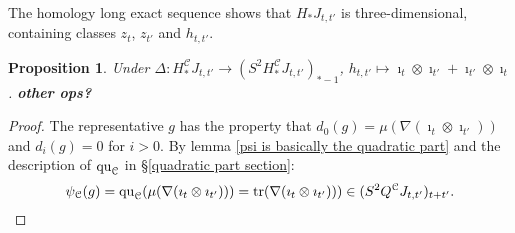 \documentclass[11pt]{amsart}
\theoremstyle{plain}
\newtheorem{prop}[thm]{Proposition}
\theoremstyle{definition}
\DeclareMathOperator{\trace}{tr}
\renewcommand{\to}{\longrightarrow}
\newcommand{\calc}{\mathcal{C}}
\theoremstyle{plain}
\newcommand{\quadratic}{\textup{qu}}
\newcommand{\Nabla}{\nabla}
\begin{document}
\begin{Operations on the Bousfield-Kan spectral sequence}
The homology long exact sequence shows that $H_*J_{t,t'}$ is three-dimensional, containing classes $ z_t$, $ z_{t'}$ and $h_{t,t'}$.
\begin{prop}\label{prop on three cell}
Under $\Delta:H_*^{\calc}J_{t,t'}\to (S^2H_*^{\calc}J_{t,t'})_{*-1}$, $h_{t,t'}\mapsto\imath_t\otimes\imath_{t'}+\imath_{t'}\otimes\imath_t$. \textbf{other ops?}
\end{prop}
\begin{proof}
The representative $g$ has the property that $d_0(g)=\mu(\Nabla(\imath_t\otimes\imath_{t'}))$ and $d_i(g)=0$ for $i>0$. By lemma \ref{psi is basically the quadratic part} and the description of $\quadratic_\calc$ in \S\ref{quadratic part section}:
\[\psi_\calc(g)=
\quadratic_\calc(\mu(\Nabla(\imath_t\otimes\imath_{t'})))=
\trace(\Nabla(\imath_t\otimes\imath_{t'})))\in (S^2Q^\calc J_{t,t'})_{t+t'}.\qedhere\]
\end{proof}


\end{Operations on the Bousfield-Kan spectral sequence}
\end{document}
